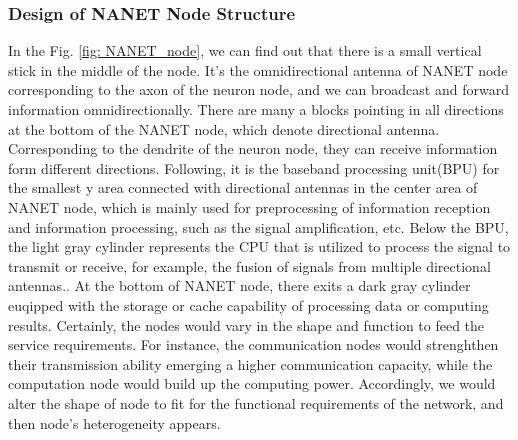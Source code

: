 \documentclass[journal,comsoc]{IEEEtran}
\begin{document}
			\subsubsection{Design of NANET Node Structure}
				In the Fig. \ref{fig: NANET_node}, we can find out that there is a small vertical stick in the middle of the node. 
				It's the omnidirectional antenna of NANET node corresponding to the axon of the neuron node, and we can broadcast and forward information omnidirectionally.
				There are many a blocks pointing in all directions at the bottom of the NANET node, which denote directional antenna. 
				Corresponding to the dendrite of the neuron node, they can receive information form different directions.
				Following, it is the baseband processing unit(BPU) for the smallest y area connected with directional antennas in the center area of NANET node,
				which is mainly used for preprocessing of information reception and information processing, such as the signal amplification, etc.
				Below the BPU, the light gray cylinder represents the CPU that is utilized to process the signal to transmit or receive, for example, the fusion of signals from multiple directional antennas..
				At the bottom of NANET node, there exits a dark gray cylinder euqipped with the storage or cache capability of processing data or computing results.
				Certainly, the nodes would vary in the shape and function to feed the service requirements.
				For instance, the communication nodes would strenghthen their transmission ability emerging a higher communication capacity, while the computation node would build up the computing power.
				Accordingly, we would alter the shape of node to fit for the functional requirements of the network, and then node's heterogeneity appears.
				
\end{document}
